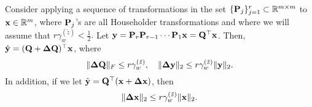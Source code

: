 
\begin{lemma}
	\label{lem:19.3}
	Consider applying a sequence of transformations in the set $\{\mathbf{P}_j\}_{j=1}^r\subset\mathbb{R}^{m\times m}$ to $\mathbf{x}\in\mathbb{R}^m$, where $\mathbf{P}_j$'s are all Householder transformations and where we will assume that $r\gamma_w^{(\tilde{z})}<\frac{1}{2}.$ 
	Let $\mathbf{y} = \mathbf{P}_r\mathbf{P}_{r-1}\cdots\mathbf{P}_1\mathbf{x} = \mathbf{Q}^{\top}\mathbf{x}$.
	Then, $\hat{\mathbf{y}} = (\mathbf{Q}+\mathbf{\Delta Q})^{\top}\mathbf{x}$, where 
	\begin{equation}
	\|\mathbf{\Delta Q}\|_F \leq r\gamma_w^{(\tilde{z})},\quad  \|\mathbf{\Delta y}\|_2 \leq r \gamma_w^{(\tilde{z})} \|\mathbf{y}\|_2.\label{eqn:19.3}
	\end{equation}
	In addition, if we let $\hat{\mathbf{y}} =\mathbf{Q}^{\top}(\mathbf{x} + \mathbf{\Delta x})$, then 
	\begin{equation}
	\|\mathbf{\Delta x}\|_2 \leq r \gamma_w^{(\tilde{z})} \|\mathbf{x}\|_2.\label{eqn:19.3c}
	\end{equation}
\end{lemma}

